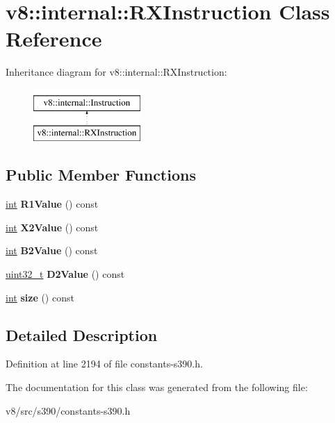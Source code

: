 \hypertarget{classv8_1_1internal_1_1RXInstruction}{}\section{v8\+:\+:internal\+:\+:R\+X\+Instruction Class Reference}
\label{classv8_1_1internal_1_1RXInstruction}
Inheritance diagram for v8\+:\+:internal\+:\+:R\+X\+Instruction\+:\begin{figure}[H]
\begin{center}
\leavevmode
\includegraphics[height=2.000000cm]{classv8_1_1internal_1_1RXInstruction}
\end{center}
\end{figure}
\subsection*{Public Member Functions}
\begin{DoxyCompactItemize}
\item 
\mbox{\label{classv8_1_1internal_1_1RXInstruction_acef21347ec69160b402d86fe0e548df7}} 
\mbox{\hyperlink{classint}{int}} {\bfseries R1\+Value} () const
\item 
\mbox{\label{classv8_1_1internal_1_1RXInstruction_ae5847796dab881535e3f983e62aba33e}} 
\mbox{\hyperlink{classint}{int}} {\bfseries X2\+Value} () const
\item 
\mbox{\label{classv8_1_1internal_1_1RXInstruction_a1c6a281993559874d2dfa08fdc929e8a}} 
\mbox{\hyperlink{classint}{int}} {\bfseries B2\+Value} () const
\item 
\mbox{\label{classv8_1_1internal_1_1RXInstruction_a55bb2b25278c864cd255515c70b5afd9}} 
\mbox{\hyperlink{classuint32__t}{uint32\+\_\+t}} {\bfseries D2\+Value} () const
\item 
\mbox{\label{classv8_1_1internal_1_1RXInstruction_a8acb0885324e6a68695523820fe67041}} 
\mbox{\hyperlink{classint}{int}} {\bfseries size} () const
\end{DoxyCompactItemize}


\subsection{Detailed Description}


Definition at line 2194 of file constants-\/s390.\+h.



The documentation for this class was generated from the following file\+:\begin{DoxyCompactItemize}
\item 
v8/src/s390/constants-\/s390.\+h\end{DoxyCompactItemize}
